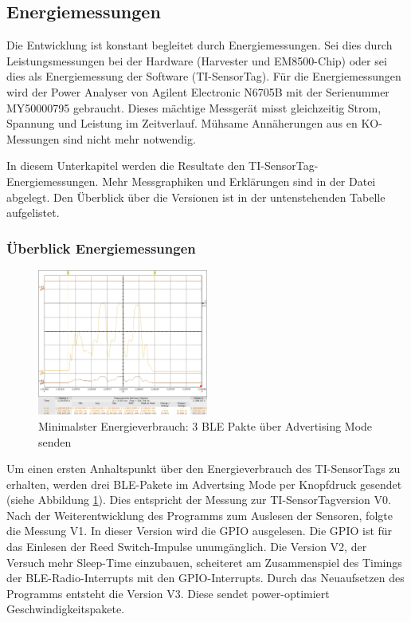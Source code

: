 \subsection{Energiemessungen}
\label{v_messungen_sensortag}


Die Entwicklung ist konstant begleitet durch Energiemessungen. Sei dies durch Leistungsmessungen bei der Hardware (Harvester und EM8500-Chip) oder sei dies als Energiemessung der Software (TI-SensorTag). Für die Energiemessungen wird der Power Analyser von Agilent Electronic N6705B mit der Serienummer MY50000795 gebraucht. Dieses mächtige Messgerät misst gleichzeitig Strom, Spannung und Leistung im Zeitverlauf. Mühsame Annäherungen aus en KO-Messungen sind nicht mehr notwendig.

In diesem Unterkapitel werden die Resultate den TI-SensorTag-Energiemessungen. Mehr Messgraphiken und Erklärungen sind in der Datei  abgelegt. Den Überblick über die Versionen ist in der untenstehenden Tabelle aufgelistet. 


\subsubsection{Überblick Energiemessungen}
\label{erst_EMessungen}

\begin{figure}[ht]
    \includegraphics[width=0.5\textwidth]{3Vorgehen/imag/v0Send33uJ.png} 
    \caption{Minimalster Energieverbrauch: 3 BLE Pakte über Advertising Mode senden}
    \label{BLE_send}
\end{figure}

Um einen ersten Anhaltspunkt über den Energieverbrauch des TI-SensorTags zu erhalten, werden drei BLE-Pakete im Advertsing Mode per Knopfdruck gesendet (siehe Abbildung \ref{BLE_send}). Dies entspricht der Messung zur TI-SensorTagversion V0. Nach der Weiterentwicklung des Programms zum Auslesen der Sensoren, folgte die Messung V1. In dieser Version wird die GPIO ausgelesen. Die GPIO ist für das Einlesen der Reed Switch-Impulse unumgänglich. Die Version V2, der Versuch mehr Sleep-Time einzubauen, scheiteret am Zusammenspiel des Timings der BLE-Radio-Interrupts mit den GPIO-Interrupts. Durch das Neuaufsetzen des Programms entsteht die Version V3. Diese sendet power-optimiert Geschwindigkeitspakete. 

